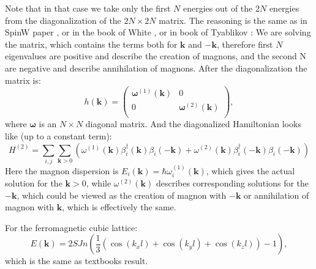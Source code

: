 \documentclass[a4paper,12pt]{article}
\begin{document}
            Note that in that case we take only the first $N$ energies out of the $2N$ energies from the 
            diagonalization of the $2N\times 2N$ matrix. The reasoning is the same as in SpinW paper \cite{toth2015linear}, 
            or in the book of White \cite{white1983quantum}, or in book of Tyablikov \cite{Tyablikov1975methods}: 
            We are solving the matrix, which contains the terms both for $\boldsymbol{k}$ and $-\boldsymbol{k}$, therefore first $N$ eigenvalues are positive and describe the creation of magnons, 
            and the second N are negative and describe annihilation of magnons. After the diagonalization the matrix is:
            \begin{equation}
                h(\boldsymbol{k}) = 
                \begin{pmatrix}
                    \boldsymbol{\omega}^{(1)}(\boldsymbol{k}) & 0 \\
                    0 & \boldsymbol{\omega}^{(2)}(\boldsymbol{k}) \\
                \end{pmatrix},
            \end{equation}
            where $\boldsymbol{\omega}$ is an $N\times N$  diagonal matrix. And the diagonalized Hamiltonian looks like (up to a constant term):
            \begin{equation}
                H^{(2)} = \sum_{i,j}\sum_{\boldsymbol{k} > 0}\left(\omega^{(1)}(\boldsymbol{k})\beta^{\dag}_i(\boldsymbol{k})\beta_i(-\boldsymbol{k}) + 
                \omega^{(2)}(\boldsymbol{k})\beta^{\dag}_i(-\boldsymbol{k})\beta_i(-\boldsymbol{k})\right)
            \end{equation}
            Here the magnon dispersion is $E_i(\boldsymbol{k}) = \hbar \omega_i^{(1)}(\boldsymbol{k})$, 
            which gives the actual solution for the $\boldsymbol{k} > 0$, while $\omega^{(2)}(\boldsymbol{k})$ describes corresponding solutions for the $-\boldsymbol{k}$, 
            which could be viewed as the creation of magnon with $-\boldsymbol{k}$ or annihilation of magnon with $\boldsymbol{k}$, which is effectively the same.
            
            For the ferromagnetic cubic lattice:
            \begin{equation}
                E(\boldsymbol{k}) = 2SJn\left(\dfrac{1}{3}\left(\cos(k_xl) + \cos(k_yl) + \cos(k_zl)\right) - 1\right),
            \end{equation}
            which is the same as textbooks result.
\end{document}
